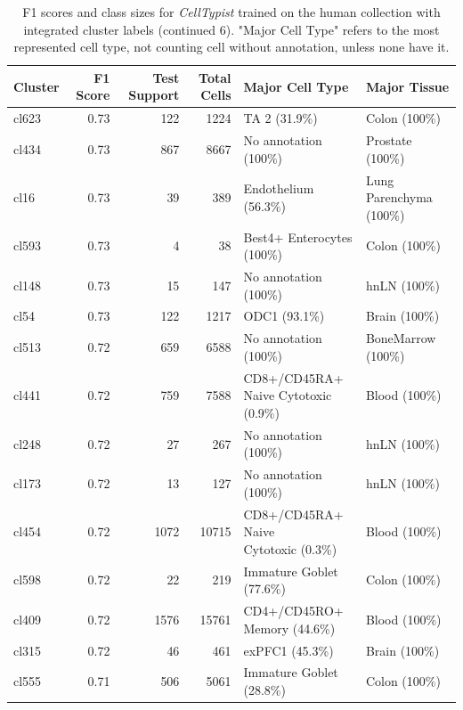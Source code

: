 \begin{table}[ht!]
\scriptsize
\caption[F1 scores and class sizes for \textit{CellTypist} trained on the human collection with integrated cluster labels (continued 6)]{F1 scores and class sizes for \textit{CellTypist} trained on the human collection with integrated cluster labels (continued 6). "Major Cell Type" refers to the most represented cell type, not counting cell without annotation, unless none have it.}
\centering
\label{table:tab_HAmodelclust6}
\begin{tabular}{lrrrll}
  \toprule
Cluster & F1 Score & Test Support & Total Cells & Major Cell Type & Major Tissue \\ 
  \midrule    
  cl623 & 0.73 & 122 & 1224 & TA 2 (31.9\%) & Colon (100\%) \\ 
  cl434 & 0.73 & 867 & 8667 & No annotation (100\%) & Prostate (100\%) \\ 
  cl16 & 0.73 &  39 & 389 & Endothelium (56.3\%) & Lung Parenchyma (100\%) \\ 
  cl593 & 0.73 &   4 &  38 & Best4+ Enterocytes (100\%) & Colon (100\%) \\ 
  cl148 & 0.73 &  15 & 147 & No annotation (100\%) & hnLN (100\%) \\ 
  cl54 & 0.73 & 122 & 1217 & ODC1 (93.1\%) & Brain (100\%) \\ 
  cl513 & 0.72 & 659 & 6588 & No annotation (100\%) & BoneMarrow (100\%) \\ 
  cl441 & 0.72 & 759 & 7588 & \specialcell[t]{CD8+/CD45RA+\\Naive Cytotoxic (0.9\%)} & Blood (100\%) \\ 
  cl248 & 0.72 &  27 & 267 & No annotation (100\%) & hnLN (100\%) \\ 
  cl173 & 0.72 &  13 & 127 & No annotation (100\%) & hnLN (100\%) \\ 
  cl454 & 0.72 & 1072 & 10715 & \specialcell[t]{CD8+/CD45RA+ Naive\\Cytotoxic (0.3\%)} & Blood (100\%) \\ 
  cl598 & 0.72 &  22 & 219 & Immature Goblet (77.6\%) & Colon (100\%) \\ 
  cl409 & 0.72 & 1576 & 15761 & \specialcell[t]{CD4+/CD45RO+\\Memory (44.6\%)} & Blood (100\%) \\ 
  cl315 & 0.72 &  46 & 461 & exPFC1 (45.3\%) & Brain (100\%) \\ 
  cl555 & 0.71 & 506 & 5061 & Immature Goblet (28.8\%) & Colon (100\%) \\ 

\end{tabular}
\end{table}
